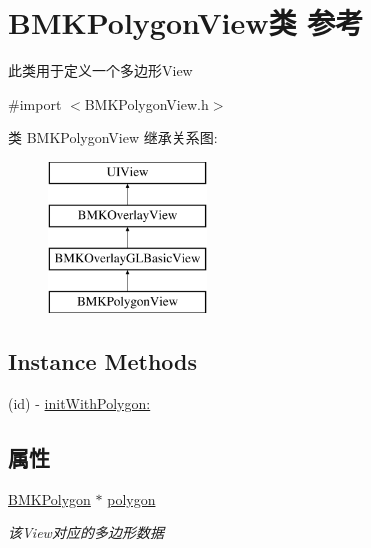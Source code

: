 \hypertarget{interface_b_m_k_polygon_view}{}\section{B\+M\+K\+Polygon\+View类 参考}
\label{interface_b_m_k_polygon_view}


此类用于定义一个多边形\+View  




{\ttfamily \#import $<$B\+M\+K\+Polygon\+View.\+h$>$}

类 B\+M\+K\+Polygon\+View 继承关系图\+:\begin{figure}[H]
\begin{center}
\leavevmode
\includegraphics[height=4.000000cm]{interface_b_m_k_polygon_view}
\end{center}
\end{figure}
\subsection*{Instance Methods}
\begin{DoxyCompactItemize}
\item 
(id) -\/ \hyperlink{interface_b_m_k_polygon_view_a447c40c6fd5c04668d7b9da823a5af26}{init\+With\+Polygon\+:}
\end{DoxyCompactItemize}
\subsection*{属性}
\begin{DoxyCompactItemize}
\item 
\hypertarget{interface_b_m_k_polygon_view_afcb56ec12abe7a03236d732f63f555bd}{}\hyperlink{interface_b_m_k_polygon}{B\+M\+K\+Polygon} $\ast$ \hyperlink{interface_b_m_k_polygon_view_afcb56ec12abe7a03236d732f63f555bd}{polygon}\label{interface_b_m_k_polygon_view_afcb56ec12abe7a03236d732f63f555bd}

\begin{DoxyCompactList}\small\item\em 该\+View对应的多边形数据 \end{DoxyCompactList}\end{DoxyCompactItemize}
